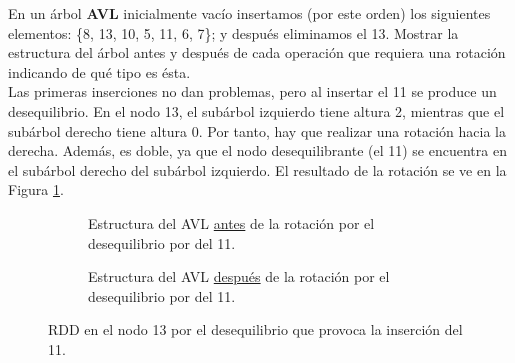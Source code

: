 \begin{ejercicio}
    En un árbol \textbf{AVL} inicialmente vacío insertamos (por este orden) los siguientes elementos: \{8, 13, 10, 5, 11, 6, 7\}; y después eliminamos el 13. Mostrar la estructura del árbol antes y después de cada operación que requiera una rotación indicando de qué tipo es ésta.\\

    Las primeras inserciones no dan problemas, pero al insertar el 11 se produce un desequilibrio. En el nodo 13, el subárbol izquierdo tiene altura 2, mientras que el subárbol derecho tiene altura 0. Por tanto, hay que realizar una rotación hacia la derecha. Además, es doble, ya que el nodo desequilibrante (el 11) se encuentra en el subárbol derecho del subárbol izquierdo. El resultado de la rotación se ve en la Figura \ref{fig:AVL_Insertar11}.
    \begin{figure}[H]
        \centering
        \begin{subfigure}{0.45\textwidth}
            \centering
            \caption{\centering Estructura del AVL \ul{antes} de la rotación por el desequilibrio por del 11.}
        \end{subfigure}
        \hfill
        \begin{subfigure}{0.45\textwidth}
            \centering
            \caption{\centering Estructura del AVL \ul{después} de la rotación por el desequilibrio por del 11.}
        \end{subfigure}
        \caption{RDD en el nodo 13 por el desequilibrio que provoca la inserción del 11.}
        \label{fig:AVL_Insertar11}
    \end{figure}


\end{ejercicio}
